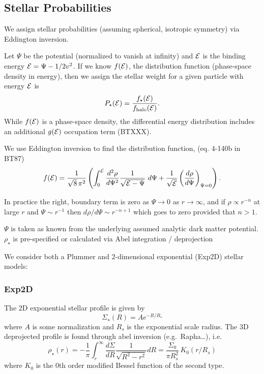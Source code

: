 \subsection{Stellar Probabilities}\label{stellar-probabilities}

We assign stellar probabilities (assuming spherical, isotropic symmetry)
via Eddington inversion.

Let \(\Psi\) be the potential (normalized to vanish at infinity) and
\({\cal E}\) is the binding energy \({\cal E} = \Psi - 1/2 v^2\). If we
know \(f({\cal E})\), the distribution function (phase-space density in
energy), then we assign the stellar weight for a given particle with
energy \({\cal E}\) is \[
P_\star({\cal E}) = \frac{f_\star({\cal E})}{f_{\rm halo}({\cal E})}.
\] While \(f({\cal E})\) is a phase-space density, the differential
energy distribution includes an additional \(g({\cal E})\) occupation
term (BTXXX).

We use Eddington inversion to find the distribution function, (eq.
4-140b in BT87) \[
f({\cal E}) = \frac{1}{\sqrt{8}\, \pi^2}\left( \int_0^{\cal E} \frac{d^2\rho}{d\Psi^2} \frac{1}{\sqrt{{\cal E} - \Psi}}\ d\Psi + \frac{1}{\sqrt{\cal E}} \left(\frac{d\rho}{d\Psi}\right)_{\Psi=0} \right).
\]

In practice the right, boundary term is zero as \(\Psi \to 0\) as
\(r\to\infty\), and if \(\rho \propto r^{-n}\) at large \(r\) and
\(\Psi \sim r^{-1}\) then \(d\rho / d\Psi \sim r^{-n+1}\) which goes to
zero provided that \(n > 1\).

\(\Psi\) is taken as known from the underlying assumed analytic dark
matter potential. \(\rho_\star\) is pre-specified or calculated via Abel
integration / deprojection

We consider both a Plummer and 2-dimensional exponential (Exp2D) stellar
models:

\subsubsection{Exp2D}\label{exp2d}

The 2D exponential stellar profile is given by \[
\Sigma_\star(R) = A e^{-R / R_s}
\] where \(A\) is some normalization and \(R_s\) is the exponential
scale radius. The 3D deprojected profile is found through abel inversion
(e.g.~Rapha\ldots), i.e. \[
\rho_\star (r) =- \frac{1}{\pi}\int_r^\infty \frac{d\Sigma}{dR} \frac{1}{\sqrt{R^2 - r^2}} dR  = \frac{\Sigma_0}{\pi R_s^2}\,K_0(r/R_s)
\] where \(K_0\) is the 0th order modified Bessel function of the second
type.

